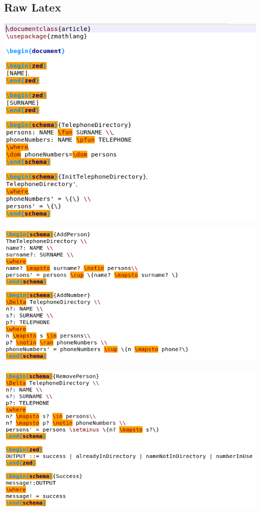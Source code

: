 \subsection{Raw Latex}
\includegraphics[scale=0.5]{examples/nonworkzcga/0imagea.png}

\noindent \includegraphics[scale=0.5]{examples/nonworkzcga/0imageb.png}

\noindent \includegraphics[scale=0.5]{examples/nonworkzcga/0imagec.png}

